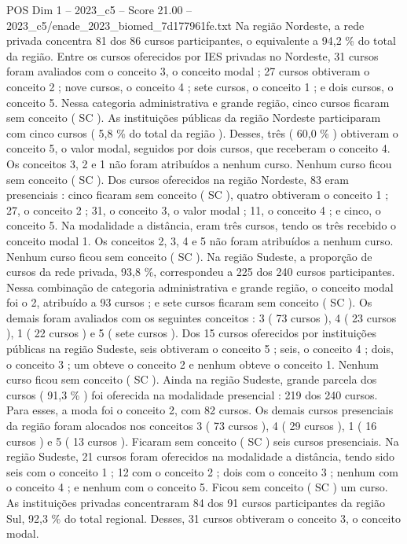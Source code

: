 \begin{textsample}{POS Dim 1 – 2023\_c5 – Score 21.00 – 2023\_c5/enade\_2023\_biomed\_7d177961fe.txt}
Na região Nordeste, a rede privada concentra 81 dos 86 cursos participantes, o equivalente a 94,2 \% do total da região.
Entre os cursos oferecidos por IES privadas no Nordeste, 31 cursos foram avaliados com o conceito 3, o conceito modal ; 27 cursos obtiveram o conceito 2 ; nove cursos, o conceito 4 ; sete cursos, o conceito 1 ; e dois cursos, o conceito 5.
Nessa categoria administrativa e grande região, cinco cursos ficaram sem conceito ( SC ).
As instituições públicas da região Nordeste participaram com cinco cursos ( 5,8 \% do total da região ).
Desses, três ( 60,0 \% ) obtiveram o conceito 5, o valor modal, seguidos por dois cursos, que receberam o conceito 4.
Os conceitos 3, 2 e 1 não foram atribuídos a nenhum curso.
Nenhum curso ficou sem conceito ( SC ).
Dos cursos oferecidos na região Nordeste, 83 eram presenciais : cinco ficaram sem conceito ( SC ), quatro obtiveram o conceito 1 ; 27, o conceito 2 ; 31, o conceito 3, o valor modal ; 11, o conceito 4 ; e cinco, o conceito 5.
Na modalidade a distância, eram três cursos, tendo os três recebido o conceito modal 1.
Os conceitos 2, 3, 4 e 5 não foram atribuídos a nenhum curso.
Nenhum curso ficou sem conceito ( SC ).
Na região Sudeste, a proporção de cursos da rede privada, 93,8 \%, correspondeu a 225 dos 240 cursos participantes.
Nessa combinação de categoria administrativa e grande região, o conceito modal foi o 2, atribuído a 93 cursos ; e sete cursos ficaram sem conceito ( SC ).
Os demais foram avaliados com os seguintes conceitos : 3 ( 73 cursos ), 4 ( 23 cursos ), 1 ( 22 cursos ) e 5 ( sete cursos ).
Dos 15 cursos oferecidos por instituições públicas na região Sudeste, seis obtiveram o conceito 5 ; seis, o conceito 4 ; dois, o conceito 3 ; um obteve o conceito 2 e nenhum obteve o conceito 1.
Nenhum curso ficou sem conceito ( SC ).
Ainda na região Sudeste, grande parcela dos cursos ( 91,3 \% ) foi oferecida na modalidade presencial : 219 dos 240 cursos.
Para esses, a moda foi o conceito 2, com 82 cursos.
Os demais cursos presenciais da região foram alocados nos conceitos 3 ( 73 cursos ), 4 ( 29 cursos ), 1 ( 16 cursos ) e 5 ( 13 cursos ).
Ficaram sem conceito ( SC ) seis cursos presenciais.
Na região Sudeste, 21 cursos foram oferecidos na modalidade a distância, tendo sido seis com o conceito 1 ; 12 com o conceito 2 ; dois com o conceito 3 ; nenhum com o conceito 4 ; e nenhum com o conceito 5.
Ficou sem conceito ( SC ) um curso.
As instituições privadas concentraram 84 dos 91 cursos participantes da região Sul, 92,3 \% do total regional.
Desses, 31 cursos obtiveram o conceito 3, o conceito modal.

\end{textsample}
